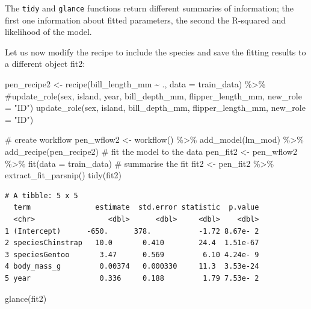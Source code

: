 \documentclass[
  letterpaper,
  DIV=11,
  numbers=noendperiod]{scrreprt}
\newenvironment{Shaded}{\begin{snugshade}}{\end{snugshade}}
\newcommand{\AttributeTok}[1]{\textcolor[rgb]{0.40,0.45,0.13}{#1}}
\newcommand{\CommentTok}[1]{\textcolor[rgb]{0.37,0.37,0.37}{#1}}
\newcommand{\FunctionTok}[1]{\textcolor[rgb]{0.28,0.35,0.67}{#1}}
\newcommand{\NormalTok}[1]{\textcolor[rgb]{0.00,0.23,0.31}{#1}}
\newcommand{\OtherTok}[1]{\textcolor[rgb]{0.00,0.23,0.31}{#1}}
\newcommand{\SpecialCharTok}[1]{\textcolor[rgb]{0.37,0.37,0.37}{#1}}
\newcommand{\StringTok}[1]{\textcolor[rgb]{0.13,0.47,0.30}{#1}}
\begin{document}
The \texttt{tidy} and \texttt{glance} functions return different
summaries of information; the first one information about fitted
parameters, the second the R-squared and likelihood of the model.

Let us now modify the recipe to include the species and save the fitting
results to a different object fit2:

\begin{Shaded}
\begin{Highlighting}[]
\NormalTok{pen\_recipe2 }\OtherTok{\textless{}{-}} 
  \FunctionTok{recipe}\NormalTok{(bill\_length\_mm }\SpecialCharTok{\textasciitilde{}}\NormalTok{ ., }\AttributeTok{data =}\NormalTok{ train\_data) }\SpecialCharTok{\%\textgreater{}\%} 
  \CommentTok{\#update\_role(sex, island, year, bill\_depth\_mm, flipper\_length\_mm, new\_role = "ID")}
  \FunctionTok{update\_role}\NormalTok{(sex, island, bill\_depth\_mm, flipper\_length\_mm, }\AttributeTok{new\_role =} \StringTok{"ID"}\NormalTok{) }

\CommentTok{\# create workflow}
\NormalTok{pen\_wflow2 }\OtherTok{\textless{}{-}} 
  \FunctionTok{workflow}\NormalTok{() }\SpecialCharTok{\%\textgreater{}\%} 
  \FunctionTok{add\_model}\NormalTok{(lm\_mod) }\SpecialCharTok{\%\textgreater{}\%} 
  \FunctionTok{add\_recipe}\NormalTok{(pen\_recipe2)}
\CommentTok{\# fit the model to the data}
\NormalTok{pen\_fit2 }\OtherTok{\textless{}{-}} 
\NormalTok{  pen\_wflow2 }\SpecialCharTok{\%\textgreater{}\%} 
  \FunctionTok{fit}\NormalTok{(}\AttributeTok{data =}\NormalTok{ train\_data)}
\CommentTok{\# summarise the fit}
\NormalTok{fit2 }\OtherTok{\textless{}{-}}\NormalTok{ pen\_fit2 }\SpecialCharTok{\%\textgreater{}\%} 
  \FunctionTok{extract\_fit\_parsnip}\NormalTok{() }
\FunctionTok{tidy}\NormalTok{(fit2)}
\end{Highlighting}
\end{Shaded}

\begin{verbatim}
# A tibble: 5 x 5
  term               estimate  std.error statistic  p.value
  <chr>                 <dbl>      <dbl>     <dbl>    <dbl>
1 (Intercept)      -650.      378.           -1.72 8.67e- 2
2 speciesChinstrap   10.0       0.410        24.4  1.51e-67
3 speciesGentoo       3.47      0.569         6.10 4.24e- 9
4 body_mass_g         0.00374   0.000330     11.3  3.53e-24
5 year                0.336     0.188         1.79 7.53e- 2
\end{verbatim}

\begin{Shaded}
\begin{Highlighting}[]
\FunctionTok{glance}\NormalTok{(fit2) }
\end{Highlighting}
\end{Shaded}
\end{document}
